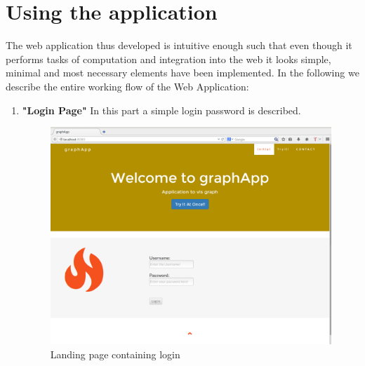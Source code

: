 \section{Using the application}
The web application thus developed is intuitive enough such that even though it performs tasks of computation and integration into the web it looks simple, minimal and most necessary elements have been implemented.
In the following we describe the entire working flow of the Web Application:
\begin{enumerate}
\item \textbf{"Login Page"} In this part a simple login password is described.  
\begin{figure}[H]
\centering
\includegraphics[scale=0.3]{s1.png}
\caption{Landing page containing login}
\end{figure}


\end{enumerate}
